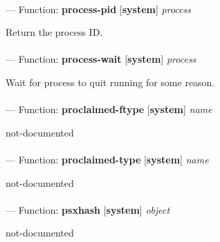 \paragraph{}
\label{SYSTEM:PROCESS-PID}
--- Function: \textbf{process-pid} [\textbf{system}] \textit{process}

\begin{adjustwidth}{5em}{5em}
Return the process ID.
\end{adjustwidth}

\paragraph{}
\label{SYSTEM:PROCESS-WAIT}
--- Function: \textbf{process-wait} [\textbf{system}] \textit{process}

\begin{adjustwidth}{5em}{5em}
Wait for process to quit running for some reason.
\end{adjustwidth}

\paragraph{}
\label{SYSTEM:PROCLAIMED-FTYPE}
--- Function: \textbf{proclaimed-ftype} [\textbf{system}] \textit{name}

\begin{adjustwidth}{5em}{5em}
not-documented
\end{adjustwidth}

\paragraph{}
\label{SYSTEM:PROCLAIMED-TYPE}
--- Function: \textbf{proclaimed-type} [\textbf{system}] \textit{name}

\begin{adjustwidth}{5em}{5em}
not-documented
\end{adjustwidth}

\paragraph{}
\label{SYSTEM:PSXHASH}
--- Function: \textbf{psxhash} [\textbf{system}] \textit{object}

\begin{adjustwidth}{5em}{5em}
not-documented
\end{adjustwidth}

